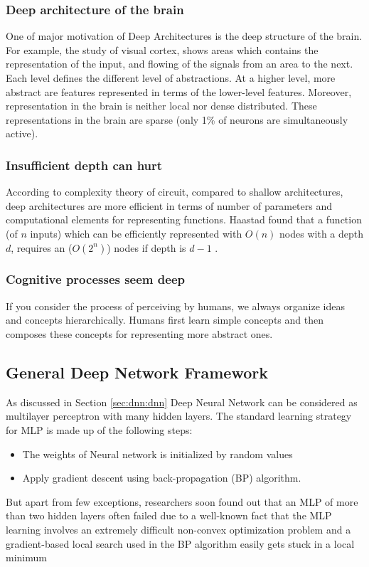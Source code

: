 \subsubsection{Deep architecture of the brain}
One of major motivation of Deep Architectures is the deep structure of the brain. For example, the study of visual cortex, shows areas which contains the representation of the input, and flowing of the signals from an area to the next. Each level defines the different level of abstractions. At a higher level, more abstract are features represented in terms of the lower-level features. Moreover, representation in the brain is neither local nor dense distributed. These representations in the brain are sparse (only 1\% of neurons are simultaneously active).

\subsubsection{Insufficient depth can hurt}
According to complexity theory of circuit, compared to shallow architectures, deep architectures are more efficient in terms of number of parameters and computational elements for representing functions\citep{bengio2007scaling}. Haastad found that a function (of $n$ inputs) which can be efficiently represented with $O(n)$ nodes with a depth $d$, requires an ($O(2^n)$) nodes if depth is $d-1$ \citep{bengio2007greedy}.

\subsubsection{Cognitive processes seem deep}
If you consider the process of perceiving by humans, we always organize ideas and concepts hierarchically. Humans first learn simple concepts and then composes these concepts for representing more abstract ones. 

\subsection{General Deep Network Framework}
As discussed in Section \ref{sec:dnn:dnn} Deep Neural Network can be considered as multilayer perceptron with many hidden layers. The standard learning strategy for MLP is made up of the following steps:\\
\begin{itemize}
\item The weights of Neural network is initialized by random values
\item Apply gradient descent using back-propagation (BP) algorithm.
\end{itemize}
But apart from few exceptions, researchers soon found out that an MLP of more than two hidden layers often failed \cite{bengio2007greedy} due to a well-known fact that the MLP learning involves an extremely difficult non-convex optimization problem and a gradient-based local search used in
the BP algorithm easily gets stuck in a local minimum 

